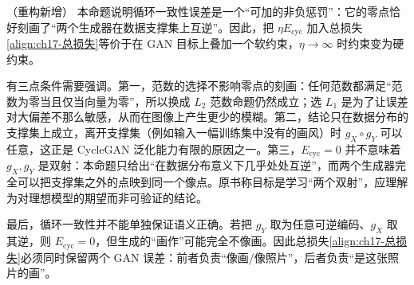\documentclass[../../main.tex]{subfiles}
\begin{document}
\begin{remark}（重构新增）
本命题说明循环一致性误差是一个“可加的非负惩罚”：它的零点恰好刻画了“两个生成器在数据支撑集上互逆”。因此，把 $\eta E_{\mathrm{cyc}}$ 加入总损失\eqref{align:ch17-总损失}等价于在 GAN 目标上叠加一个软约束，$\eta\to\infty$ 时约束变为硬约束。

有三点条件需要强调。第一，范数的选择不影响零点的刻画：任何范数都满足“范数为零当且仅当向量为零”，所以换成 $L_2$ 范数命题仍然成立；选 $L_1$ 是为了让误差对大偏差不那么敏感，从而在图像上产生更少的模糊。第二，结论只在数据分布的支撑集上成立，离开支撑集（例如输入一幅训练集中没有的画风）时 $g_X\circ g_Y$ 可以任意，这正是 CycleGAN 泛化能力有限的原因之一。第三，$E_{\mathrm{cyc}}=0$ 并不意味着 $g_X,g_Y$ 是双射：本命题只给出“在数据分布意义下几乎处处互逆”，而两个生成器完全可以把支撑集之外的点映到同一个像点。原书称目标是学习“两个双射”，应理解为对理想模型的期望而非可验证的结论。

最后，循环一致性并不能单独保证语义正确。若把 $g_Y$ 取为任意可逆编码、$g_X$ 取其逆，则 $E_{\mathrm{cyc}}=0$，但生成的“画作”可能完全不像画。因此总损失\eqref{align:ch17-总损失}必须同时保留两个 GAN 误差：前者负责“像画/像照片”，后者负责“是这张照片的画”。
\end{remark}
\end{document}
